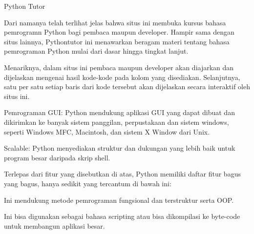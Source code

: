 \vspace{14pt}
\noindent 
{\fontsize{14pt}{14pt}\selectfont Python Tutor \\} \par
\noindent 
{\fontsize{14pt}{14pt}\selectfont Dari namanya telah terlihat jelas bahwa situs ini membuka kursus bahasa pemrogramn Python bagi pembaca maupun developer. Hampir sama dengan situs lainnya, Pythontutor ini menawarkan beragam materi tentang bahasa pemrograman Python mulai dari dasar hingga tingkat lanjut. \\} \par
\noindent 
{\fontsize{14pt}{14pt}\selectfont Menariknya, dalam situs ini pembaca maupun developer akan diajarkan dan dijelaskan mengenai hasil kode-kode pada kolom yang disediakan. Selanjutnya, satu per satu setiap baris dari kode tersebut akan dijelaskan secara interaktif oleh situs ini. \\} \par
\vspace{14pt}
\noindent 
{\fontsize{14pt}{14pt}\selectfont Pemrograman GUI: Python mendukung aplikasi GUI yang dapat dibuat dan dikirimkan ke banyak sistem panggilan, perpustakaan dan sistem windows, seperti Windows MFC, Macintosh, dan sistem X Window dari Unix. \\} \par
\vspace{14pt}
\noindent 
{\fontsize{14pt}{14pt}\selectfont Scalable: Python menyediakan struktur dan dukungan yang lebih baik untuk program besar daripada skrip shell. \\} \par
\vspace{14pt}
\noindent 
{\fontsize{14pt}{14pt}\selectfont Terlepas dari fitur yang disebutkan di atas, Python memiliki daftar fitur bagus yang bagus, hanya sedikit yang tercantum di bawah ini: \\} \par
\vspace{14pt}
\noindent 
{\fontsize{14pt}{14pt}\selectfont Ini mendukung metode pemrograman fungsional dan terstruktur serta OOP. \\} \par
\vspace{14pt}
\noindent 
{\fontsize{14pt}{14pt}\selectfont Ini bisa digunakan sebagai bahasa scripting atau bisa dikompilasi ke byte-code untuk membangun aplikasi besar. \\} \par
\vspace{14pt}
